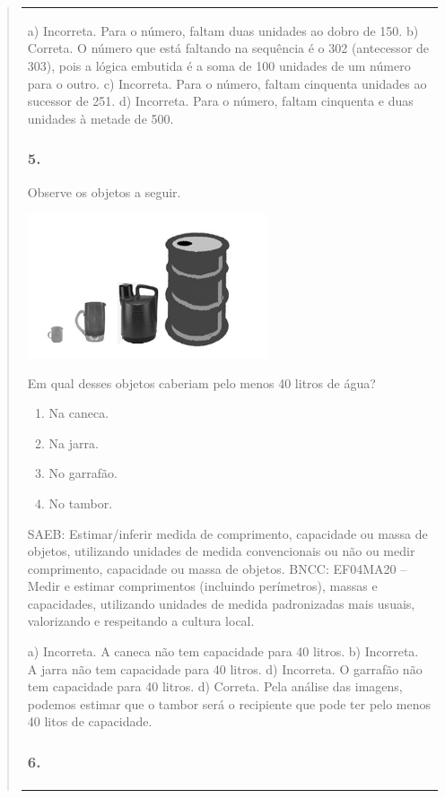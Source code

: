 \begin{mdframed}[linewidth=2pt,linecolor=salmao,roundcorner=2pt]
\begin{itemize}
{\begin{itemize}
\begin{escolha}
{\begin{quote}
{\begin{escolha}
{{{{{\begin{longtable}[]{@{}l@{}}
\begin{itemize}
{a) Incorreta. Para o número, faltam duas unidades ao dobro de 150.
b) Correta. O número que está faltando na sequência é o 302 (antecessor de 303),
pois a lógica embutida é a soma de 100 unidades de um número para o
outro.
c) Incorreta. Para o número, faltam cinquenta unidades ao sucessor de 251.
d) Incorreta. Para o número, faltam cinquenta e duas unidades à metade de 500.

\subsubsection{5. }

Observe os objetos a seguir.

\includegraphics[width=2.78846in,height=1.67526in]{media/image166.png}

Em qual desses objetos caberiam pelo menos 40 litros de água?

\begin{enumerate}
\item
  Na caneca.
\item
  Na jarra.
\item
  No garrafão.
\item
  No tambor.
\end{enumerate}

SAEB: Estimar/inferir medida de comprimento, capacidade ou
massa de objetos, utilizando unidades de medida convencionais ou não ou
medir comprimento, capacidade ou massa de objetos.
BNCC: EF04MA20 -- Medir e estimar comprimentos (incluindo perímetros), massas e capacidades, utilizando
unidades de medida padronizadas mais usuais, valorizando e respeitando a cultura local.

a) Incorreta. A caneca não tem capacidade para 40 litros.
b) Incorreta. A jarra não tem capacidade para 40 litros.
d) Incorreta. O garrafão não tem capacidade para 40 litros.
d) Correta. Pela análise das imagens, podemos estimar que o tambor será o recipiente que
pode ter pelo menos 40 litos de capacidade.

\subsubsection{6. }

}
\end{itemize}
\end{longtable}}}}}}
\end{escolha}}
\end{quote}}
\end{escolha}
\end{itemize}}
\end{itemize}
\end{mdframed}
